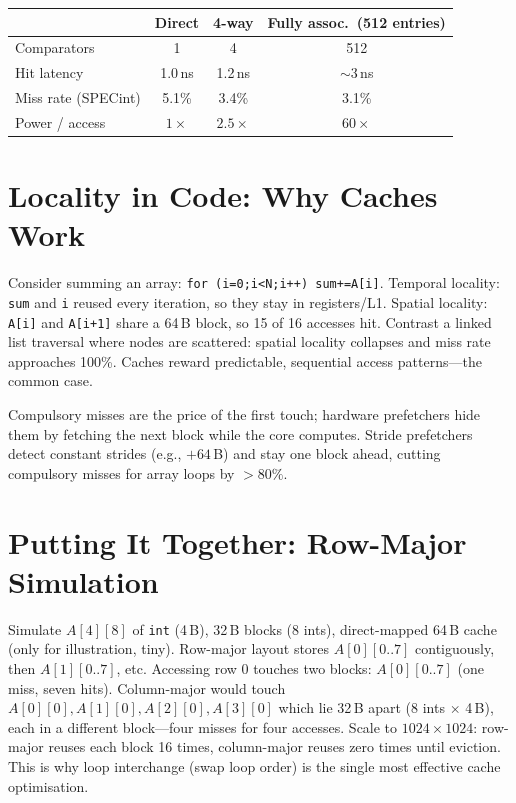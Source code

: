 \begin{center}
\small
\begin{tabular}{lccc}
\toprule
 & Direct & 4-way & Fully assoc.\ (512 entries)\\
\midrule
Comparators & 1 & 4 & 512 \\
Hit latency & 1.0\,ns & 1.2\,ns & $\sim 3$\,ns \\
Miss rate (SPECint) & 5.1\% & 3.4\% & 3.1\%\\
Power / access & $1\times$ & $2.5\times$ & $60\times$\\
\bottomrule
\end{tabular}
\end{center}
\section{Locality in Code: Why Caches Work}
Consider summing an array: \texttt{for (i=0;i<N;i++) sum+=A[i]}. Temporal locality: \texttt{sum} and \texttt{i} reused every iteration, so they stay in registers/L1. Spatial locality: \texttt{A[i]} and \texttt{A[i+1]} share a 64\,B block, so 15 of 16 accesses hit. Contrast a linked list traversal where nodes are scattered: spatial locality collapses and miss rate approaches 100\%. Caches reward predictable, sequential access patterns---the common case.

Compulsory misses are the price of the first touch; hardware prefetchers hide them by fetching the next block while the core computes. Stride prefetchers detect constant strides (e.g., $+64$\,B) and stay one block ahead, cutting compulsory misses for array loops by $>80\%$.

\section{Putting It Together: Row-Major Simulation}
Simulate $A[4][8]$ of \texttt{int} (4\,B), 32\,B blocks (8 ints), direct-mapped 64\,B cache (only for illustration, tiny). Row-major layout stores $A[0][0..7]$ contiguously, then $A[1][0..7]$, etc. Accessing row 0 touches two blocks: $A[0][0..7]$ (one miss, seven hits). Column-major would touch $A[0][0],A[1][0],A[2][0],A[3][0]$ which lie 32\,B apart (8 ints $\times$ 4\,B), each in a different block---four misses for four accesses. Scale to $1024\times1024$: row-major reuses each block 16 times, column-major reuses zero times until eviction. This is why loop interchange (swap loop order) is the single most effective cache optimisation.

